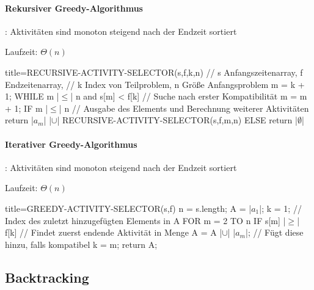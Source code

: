 \documentclass[
    ngerman,
    color=3b,
    summary,
    boxarc,
]{rubos-tuda-template}
\begin{document}
\paragraph{Rekursiver Greedy-Algorithmus}\mbox{}
\begin{grayInfoBox}
    : Aktivitäten sind monoton steigend nach der Endzeit sortiert
\end{grayInfoBox}
Laufzeit: $\Theta(n)$

\begin{codeBlock}[autogobble,escapeinside=||]{title={RECURSIVE-ACTIVITY-SELECTOR(s,f,k,n)}}
    // s Anfangszeitenarray, f Endzeitenarray, 
    // k Index von Teilproblem, n Grö\ss{}e Anfangsproblem
    m = k + 1;
    WHILE m |$\leq$| n and s[m] < f[k]  // Suche nach erster Kompatibilität
        m = m + 1;
    IF m |$\leq$| n
        // Ausgabe des Elements und Berechnung weiterer Aktivitäten
        return {|$a_m$|} |$\cup$| RECURSIVE-ACTIVITY-SELECTOR(s,f,m,n)
    ELSE
        return |$\emptyset$|
\end{codeBlock}

\paragraph{Iterativer Greedy-Algorithmus}\mbox{}
\begin{grayInfoBox}
    : Aktivitäten sind monoton steigend nach der Endzeit sortiert
\end{grayInfoBox}
Laufzeit: $\Theta(n)$
\begin{codeBlock}[autogobble,escapeinside=||]{title={GREEDY-ACTIVITY-SELECTOR(s,f)}}
    n = s.length;
    A = {|$a_1$|};
    k = 1;          // Index des zuletzt hinzugefügten Elements in A
    FOR m = 2 TO n                      
        IF s[m] |$\geq$| f[k]       // Findet zuerst endende Aktivität in Menge
            A = A |$\cup$| {|$a_m$|};   // Fügt diese hinzu, falls kompatibel
            k = m;
    return A;
\end{codeBlock}

\clearpage
\subsection{Backtracking}
\end{document}
